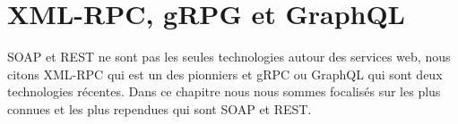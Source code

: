 \section{XML-RPC, gRPG et GraphQL}
SOAP et REST ne sont pas les seules technologies autour des services web, nous citons XML-RPC\cite{XMLRPC} qui est un des pionniers et gRPC\cite{gRPC} ou GraphQL\cite{GraphQL} qui sont deux technologies récentes. Dans ce chapitre nous nous sommes focalisés sur les plus connues et les plus rependues qui sont SOAP et REST.

%
%
%
